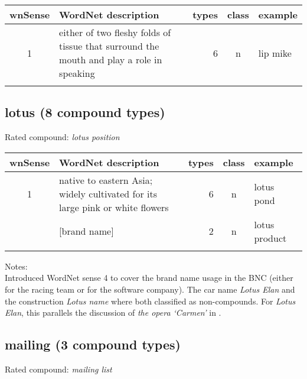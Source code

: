 \noindent
\begin{longtable}{c>{\raggedright\arraybackslash}p{5cm}rc>{\raggedright\arraybackslash}p{2cm}}\lsptoprule
{\small wnSense}&WordNet description&types&class&example\\\midrule
1&either of two fleshy folds of tissue that surround the mouth and play a role in speaking&6&n&lip mike\\\lspbottomrule
\end{longtable}

\pagebreak[4]
\subsection{lotus        (8 compound types)}
Rated compound: \emph{lotus position}


\noindent
\begin{longtable}{c>{\raggedright\arraybackslash}p{5cm}rc>{\raggedright\arraybackslash}p{2cm}}\lsptoprule
{\small wnSense}&WordNet description&types&class&example\\\midrule
1&native to eastern Asia; widely cultivated for its large pink or white flowers&6&n&lotus pond\\\tablevspace
4&{}[brand name]&2&n&lotus product\\\lspbottomrule
\end{longtable}

\noindent
Notes:\\
Introduced WordNet sense 4 to cover the brand name usage in the BNC
(either for the racing team or for the software company). The car name
\emph{Lotus Elan} and the construction \emph{Lotus name} where both
classified as non-compounds. For \emph{Lotus Elan}, this parallels the
discussion of \emph{the opera `Carmen'} in \citet[447, section 14.2]{HuddlestonandPullum:2002}.

\subsection{mailing      (3 compound types)}
Rated compound: \emph{mailing list}

\vspace*{1ex}


